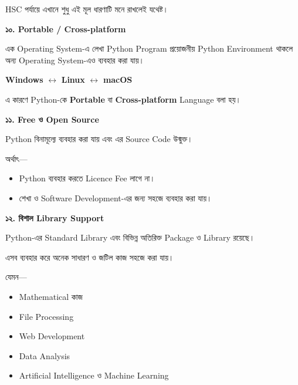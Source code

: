 HSC পর্যায়ে এখানে শুধু এই মূল ধারণাটি মনে রাখলেই যথেষ্ট।


\textbf{\color{darkTeal}১০. Portable / Cross-platform}

এক Operating System-এ লেখা Python Program প্রয়োজনীয়
Python Environment থাকলে অন্য Operating System-এও
ব্যবহার করা যায়।

\begin{center}

\textbf{Windows}
\(\longleftrightarrow\)
\textbf{Linux}
\(\longleftrightarrow\)
\textbf{macOS}

\end{center}

এ কারণে Python-কে
\textbf{Portable} বা
\textbf{Cross-platform}
Language বলা হয়।


\textbf{\color{darkTeal}১১. Free ও Open Source}

Python বিনামূল্যে ব্যবহার করা যায় এবং এর Source Code উন্মুক্ত।

অর্থাৎ—

\begin{itemize}

\item Python ব্যবহার করতে Licence Fee লাগে না।

\item শেখা ও Software Development-এর জন্য সহজে ব্যবহার করা যায়।

\end{itemize}


\textbf{\color{darkTeal}১২. বিশাল Library Support}

Python-এর Standard Library এবং বিভিন্ন অতিরিক্ত
Package ও Library রয়েছে।

এসব ব্যবহার করে অনেক সাধারণ ও জটিল কাজ সহজে করা যায়।

যেমন—

\begin{itemize}

\item Mathematical কাজ

\item File Processing

\item Web Development

\item Data Analysis

\item Artificial Intelligence ও Machine Learning

\end{itemize}

